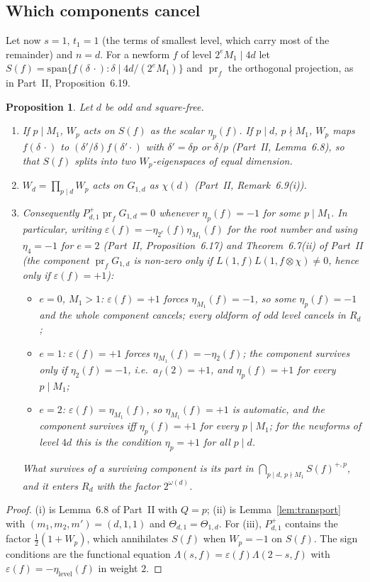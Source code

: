 \documentclass[11pt,a4paper]{article}
\newtheorem{proposition}[theorem]{Proposition}
\theoremstyle{remark}
\theoremstyle{definition}
\newcommand{\e}{\varepsilon}
\DeclareMathOperator{\pr}{pr}
\begin{document}
\subsection{Which components cancel}
Let now $s=1$, $t_1=1$ (the terms of smallest level, which carry most of the remainder) and $n=d$. For a newform $f$ of level $2^eM_1\mid4d$ let $S(f)=\mathrm{span}\{f(\delta\,\cdot):\delta\mid4d/(2^eM_1)\}$ and $\pr_f$ the orthogonal projection, as in Part~II, Proposition~6.19.

\begin{proposition}\label{prop:cancel}
Let $d$ be odd and square-free.
\begin{enumerate}[label=\textup{(\roman*)},leftmargin=2.2em]
\item If $p\mid M_1$, $W_p$ acts on $S(f)$ as the scalar $\eta_p(f)$. If $p\mid d$, $p\nmid M_1$, $W_p$ maps $f(\delta\,\cdot)$ to $(\delta'/\delta)f(\delta'\cdot)$ with $\delta'=\delta p$ or $\delta/p$ (Part~II, Lemma~6.8), so that $S(f)$ splits into two $W_p$-eigenspaces of equal dimension.
\item $W_d=\prod_{p\mid d}W_p$ acts on $G_{1,d}$ as $\chi(d)$ (Part~II, Remark~6.9(i)).
\item Consequently $P^+_{d,1}\pr_fG_{1,d}=0$ whenever $\eta_p(f)=-1$ for some $p\mid M_1$. In particular, writing $\e(f)=-\eta_{2^e}(f)\eta_{M_1}(f)$ for the root number and using $\eta_4=-1$ for $e=2$ (Part~II, Proposition~6.17) and Theorem~6.7(ii) of Part~II (the component $\pr_fG_{1,d}$ is non-zero only if $L(1,f)L(1,f\otimes\chi)\ne0$, hence only if $\e(f)=+1$):
\begin{itemize}[leftmargin=1.6em]
\item $e=0$, $M_1>1$: $\e(f)=+1$ forces $\eta_{M_1}(f)=-1$, so some $\eta_p(f)=-1$ and the whole component cancels; \emph{every oldform of odd level cancels in $R_d$};
\item $e=1$: $\e(f)=+1$ forces $\eta_{M_1}(f)=-\eta_2(f)$; the component survives only if $\eta_2(f)=-1$, i.e.\ $a_f(2)=+1$, and $\eta_p(f)=+1$ for every $p\mid M_1$;
\item $e=2$: $\e(f)=\eta_{M_1}(f)$, so $\eta_{M_1}(f)=+1$ is automatic, and the component survives iff $\eta_p(f)=+1$ for every $p\mid M_1$; for the newforms of level $4d$ this is the condition $\eta_p=+1$ for all $p\mid d$.
\end{itemize}
What survives of a surviving component is its part in $\bigcap_{p\mid d,\,p\nmid M_1}S(f)^{+,p}$, and it enters $R_d$ with the factor $2^{\omega(d)}$.
\end{enumerate}
\end{proposition}
\begin{proof}
(i) is Lemma~6.8 of Part~II with $Q=p$; (ii) is Lemma~\ref{lem:transport} with $(m_1,m_2,m')=(d,1,1)$ and $\Theta_{d,1}=\Theta_{1,d}$. For (iii), $P^+_{d,1}$ contains the factor $\frac12(1+W_p)$, which annihilates $S(f)$ when $W_p=-1$ on $S(f)$. The sign conditions are the functional equation $\Lambda(s,f)=\e(f)\Lambda(2-s,f)$ with $\e(f)=-\eta_{\mathrm{level}}(f)$ in weight $2$.
\end{proof}
\end{document}
